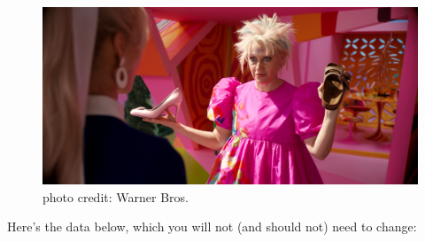 \documentclass[
  letterpaper,
  DIV=11,
  numbers=noendperiod]{scrreprt}
\begin{document}
\begin{figure}

{\centering \includegraphics{scripts/01_codingBasics/class2_files/weirdbarbie.jpeg}

}

\caption{photo credit: Warner Bros.}

\end{figure}

Here's the data below, which you will not (and should not) need to
change:
\end{document}

